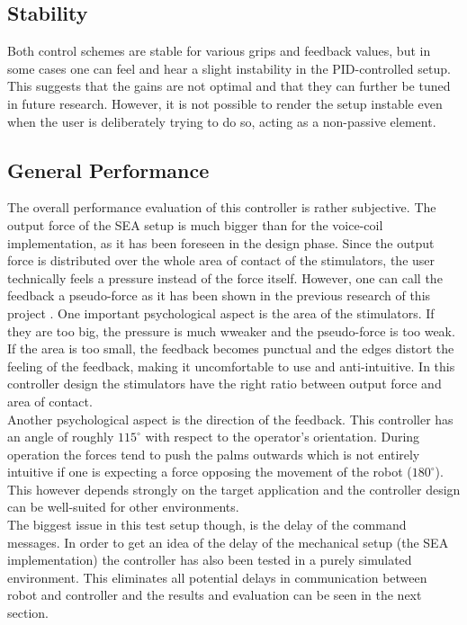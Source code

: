 \subsection{Stability}
Both control schemes are stable for various grips and feedback values, but in some cases one can feel and hear a slight instability in the PID-controlled setup. This suggests that the gains are not optimal and that they can further be tuned in future research. However, it is not possible to render the setup instable even when the user is deliberately trying to do so, acting as a non-passive element. 

\subsection{General Performance}
The overall performance evaluation of this controller is rather subjective. The output force of the SEA setup is much bigger than for the voice-coil implementation, as it has been foreseen in the design phase. Since the output force is distributed over the whole area of contact of the stimulators, the user technically feels a pressure instead of the force itself. However, one can call the feedback a pseudo-force as it has been shown in the previous research of this project \cite{Asada2016}. One important psychological aspect is the area of the stimulators. If they are too big, the pressure is much wweaker and the pseudo-force is too weak. If the area is too small, the feedback becomes punctual and the edges distort the feeling of the feedback, making it uncomfortable to use and anti-intuitive. In this controller design the stimulators have the right ratio between output force and area of contact.\\
Another psychological aspect is the direction of the feedback. This controller has an angle of roughly $ 115^\circ$ with respect to the operator's orientation. During operation the forces tend to push the palms outwards which is not entirely intuitive if one is expecting a force opposing the movement of the robot ($180 ^\circ$). This however depends strongly on the target application and the controller design can be well-suited for other environments.\\ %

The biggest issue in this test setup though, is the delay of the command messages. In order to get an idea of the delay of the mechanical setup (the SEA implementation) the controller has also been tested in a purely simulated environment. This eliminates all potential delays in communication between robot and controller and the results and evaluation can be seen in the next section.

